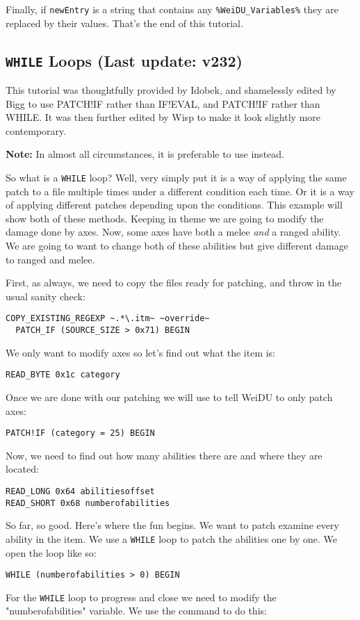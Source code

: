 \documentclass{article}
\def\ttref#1{\ahrefloc{#1}{\tt #1}}
\def\DEFINE#1{{\tt \bf #1}\label{#1}\index{#1}}
\def\t#1{{\tt #1}}
\begin{document}
Finally, if \t{newEntry} is a string that contains any
\t{\%WeiDU\_Variables\%} they are replaced by their values.
That's the end of this tutorial.

\subsection{\DEFINE{WHILE} Loops (Last update: v232)}

This tutorial was thoughtfully provided by Idobek, and shamelessly edited
by Bigg to use PATCH!IF rather than IF!EVAL, and PATCH!IF rather than WHILE.
It was then further edited by Wisp to make it look slightly more contemporary.

\textbf{Note:} In almost all circumstances, it is preferable to use \ttref{FOR}
instead.

So what is a \t{WHILE} loop? Well, very simply put it is a way of
applying the same patch to a file multiple times under a different
condition each time. Or it is a way of applying different patches depending
upon the conditions. This example will show both of these methods. Keeping
in theme we are going to modify the damage done by axes. Now, some axes
have both a melee \emph{and} a ranged ability. We are going to want to
change both of these abilities but give different damage to ranged and
melee.


First, as always, we need to copy the files ready for patching, and throw
in the usual sanity check:
\begin{verbatim}
COPY_EXISTING_REGEXP ~.*\.itm~ ~override~
  PATCH_IF (SOURCE_SIZE > 0x71) BEGIN
\end{verbatim}
We only want to modify axes so let's find out what the item is:
\begin{verbatim}
READ_BYTE 0x1c category
\end{verbatim}
Once we are done with our patching we will use \ttref{PATCH!IF} to tell
WeiDU to only patch axes:

\begin{verbatim}
PATCH!IF (category = 25) BEGIN
\end{verbatim}
Now, we need to find out how many abilities there are and where they are
located:
\begin{verbatim}
READ_LONG 0x64 abilitiesoffset
READ_SHORT 0x68 numberofabilities
\end{verbatim}
So far, so good. Here's where the fun begins. We want to patch examine
every ability in the item. We use a \t{WHILE} loop to patch the
abilities one by one. We open the loop like so:
\begin{verbatim}
WHILE (numberofabilities > 0) BEGIN
\end{verbatim}
For the \t{WHILE} loop to progress and close we need to modify the
"numberofabilities" variable. We use the \ttref{SET} command to do this:
\end{document}
